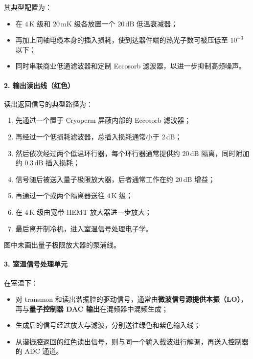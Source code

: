 \documentclass[12pt,a4paper,oneside]{ctexbook}
\begin{document}
其典型配置为：

\begin{itemize}
    \item 在 $4\,\mathrm{K}$ 级和 $20\,\mathrm{mK}$ 级各放置一个 $20\,\mathrm{dB}$ 低温衰减器；
    \item 再加上同轴电缆本身的插入损耗，使到达器件端的热光子数可被压低至 $10^{-3}$ 以下；
    \item 同时串联商业低通滤波器和定制 Eccosorb 滤波器，以进一步抑制高频噪声。
\end{itemize}

\paragraph{2. 输出读出线（红色）}

读出返回信号的典型路径为：

\begin{enumerate}
    \item 先通过一个置于 Cryoperm 屏蔽内部的 Eccosorb 滤波器；
    \item 再经过一个低损耗滤波器，总插入损耗通常小于 $2\,\mathrm{dB}$；
    \item 然后依次经过两个低温环行器，每个环行器通常提供约 $20\,\mathrm{dB}$ 隔离，同时附加约 $0.3\,\mathrm{dB}$ 插入损耗；
    \item 信号随后被送入量子极限放大器，后者通常工作在约 $20\,\mathrm{dB}$ 增益；
    \item 再通过一个或两个隔离器送往 $4\,\mathrm{K}$ 级；
    \item 在 $4\,\mathrm{K}$ 级由宽带 HEMT 放大器进一步放大；
    \item 最后离开制冷机，进入室温信号处理电子学。
\end{enumerate}

图中未画出量子极限放大器的泵浦线。

\paragraph{3. 室温信号处理单元}

在室温下：

\begin{itemize}
    \item 对 transmon 和读出谐振腔的驱动信号，通常由\textbf{微波信号源提供本振（LO）}，再与\textbf{量子控制器 DAC 输出}在混频器中混频生成；
    \item 生成后的信号经过放大与滤波，分别送往绿色和紫色输入线；
    \item 从谐振腔返回的红色读出信号，则与同一个输入载波进行解调，再送入控制器的 ADC 通道。
\end{itemize}
\end{document}
